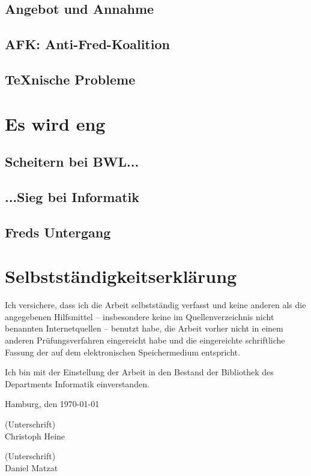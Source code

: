 \documentclass[12pt]{scrartcl}
\begin{document}
	\subsection{Angebot und Annahme}
	\subsection{AFK: Anti-Fred-Koalition}
	\subsection{TeXnische Probleme}
	
	\newpage
	\section{Es wird eng}
	\subsection{Scheitern bei BWL...}
	\subsection{...Sieg bei Informatik}
	\subsection{Freds Untergang}

	\newpage
	\begin{raggedright}%
		\begin{thebibliography}{XXXXXXXX}
		\end{thebibliography}
	\end{raggedright}
	
	\newpage
	
	\section{Selbstständigkeitserklärung}
	
	Ich versichere, dass ich die Arbeit selbstständig verfasst und keine anderen als die angegebenen Hilfsmittel -- insbesondere keine im Quellenverzeichnis nicht benannten Internetquellen -- benutzt habe, die Arbeit vorher nicht in einem anderen Prüfungsverfahren eingereicht habe und die eingereichte schriftliche Fassung der auf dem elektronischen Speichermedium entspricht.
	
	Ich bin mit der Einstellung der Arbeit in den Bestand der Bibliothek des Departments Informatik einverstanden.
	
	Hamburg, den \today
	
	\bigskip
	(Unterschrift)\\
	Christoph Heine
	
	\bigskip
	\bigskip
	(Unterschrift)\\
	Daniel Matzat
	
\end{document}

